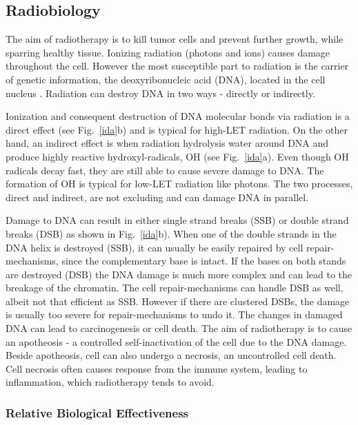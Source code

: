 \documentclass[type=dr, dr=rernat, accentcolor=tud7b,colorbacktitle, bigchapter, openright, twoside, 12pt ]{tudthesis}
\begin{document}
\subsection{Radiobiology}

The aim of radiotherapy is to kill tumor cells and prevent further growth, while sparring healthy tissue. Ionizing radiation (photons and ions) causes damage throughout the cell. However the most susceptible part to radiation is the
carrier of genetic information, the deoxyribonucleic acid (DNA), located in the cell nucleus \cite{Munro1970}. Radiation can destroy DNA in two ways - directly or indirectly.

Ionization and consequent destruction of DNA molecular bonds via radiation is a direct effect (see Fig.~\ref{ida}b) and is typical for high-LET radiation. On the other hand, an indirect effect is when radiation hydrolysis water around DNA and produce highly reactive hydroxyl-radicals, OH 
(see Fig.~\ref{ida}a). Even though OH radicals decay fast, they are still able to cause severe damage to DNA. The formation of OH is typical for low-LET radiation like photons. The two processes, direct and indirect, are not excluding and can damage DNA in parallel.

Damage to DNA can result in either single strand breaks (SSB) or double strand breaks (DSB) as shown in Fig.~\ref{ida}b). When one of the double strands in the DNA helix is destroyed (SSB), it can usually be easily repaired by cell 
repair-mechanisms, since the complementary base is intact. If the bases on both stands are destroyed (DSB) the DNA damage is much more complex and can lead to the breakage of the chromatin. The cell repair-mechanisms can handle DSB as well, 
albeit not that efficient as SSB. However if there are clustered DSBs, the damage is usually too severe for repair-mechanisms to undo it. The changes in damaged DNA can lead to carcinogenesis or cell death. The aim of radiotherapy is to 
cause an apotheosis - a controlled self-inactivation of the cell due to the DNA damage. Beside apotheosis, cell can also undergo a necrosis, an uncontrolled cell death. Cell necrosis often causes response from the immune system, leading to inflammation, which
radiotherapy tends to avoid.


\subsubsection{Relative Biological Effectiveness}
\label{RBE}
\end{document}
